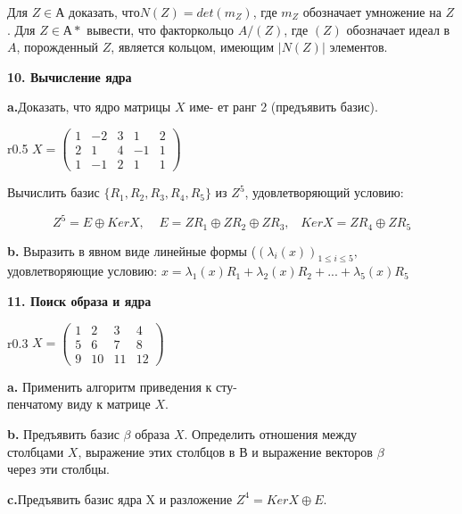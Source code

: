 \documentclass{../template/mai_book}
\begin{document}
Для $Z \in А$ доказать, $что N(Z) = det(m_Z)$, где $m_Z$ обозначает 
умножение на $Z$. Для $Z \in А*$ вывести, что факторкольцо $A/(Z)$, где $(Z)$ 
обозначает идеал в $A$, порожденный $Z$, является кольцом, имеющим $|N(Z)|$ 
элементов. 

\medskip

{\noindent\bf 10. Вычисление ядра}



{\bf a.}Доказать, что ядро матрицы $X$ име-
ет ранг 2 (предъявить базис).
\begin{wrapfigure}{r}{0.5\textwidth}
$X=\begin{pmatrix}
1 & -2 & 3 & 1 & 2\\
2 & 1 & 4 & -1 & 1\\
1 & -1 & 2 & 1 & 1
\end{pmatrix}$  
\end{wrapfigure}

Вычислить базис $\{R_1, R_2, R_3, R_4, R_5\}$ из $\mathit{Z}^5$, удовлетворяющий условию:

$$ \mathit{Z}^5=E\oplus KerX,\;\;\;\;E =\mathit{Z}R_1\oplus\mathit{Z}R_2\oplus\mathit{Z}R_3,\;\;\; Ker X= \mathit{Z}R_4\oplus\mathit{Z}R_5 $$
 
{\bf b.} Выразить в явном виде линейные формы ($(\lambda_i(x))_{1\leqslant i\leqslant 5},$ 
удовлетворяющие условию: $ x = \lambda_1(x)R_1+\lambda_2(x)R_2+...+\lambda_5(x)R_5 $


\pagebreak

{\noindent\bf11. Поиск образа и ядра}
\begin{wrapfigure}{r}{0.3\textwidth}
$X=\begin{pmatrix}
1 & 2 & 3 & 4 \\
5 & 6 & 7 & 8\\
9 & 10 & 11 & 12
\end{pmatrix}$  
\end{wrapfigure}

{\bf a.} Применить алгоритм приведения к сту-\\пенчатому виду к матрице $X$.
 
\bigskip

{\bf b.} Предъявить базис $ \beta $ образа $X$. Определить отношения между\\
столбцами $X$, выражение этих столбцов в В и выражение векторов $ \beta $\\ 
через эти столбцы. 

\medskip

{\bf c.}Предъявить базис ядра X и разложение $Z^4=Ker X \oplus E$. 
\end{document}
